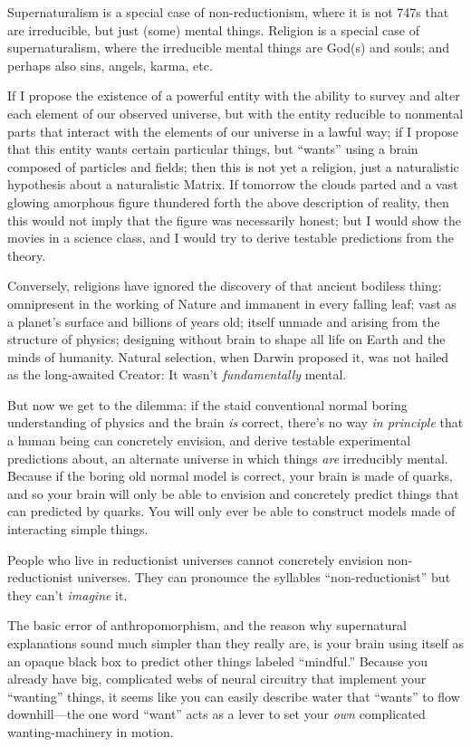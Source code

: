 {
 Supernaturalism is a special case of non-reductionism, where it is
not 747s that are irreducible, but just (some) mental things. Religion
is a special case of supernaturalism, where the irreducible mental
things are God(s) and souls; and perhaps also sins, angels, karma,
etc.}

{
 If I propose the existence of a powerful entity with the ability
to survey and alter each element of our observed universe, but with the
entity reducible to nonmental parts that interact with the elements of
our universe in a lawful way; if I propose that this entity wants
certain particular things, but
``wants'' using a brain composed of
particles and fields; then this is not yet a religion, just a
naturalistic hypothesis about a naturalistic Matrix. If tomorrow the
clouds parted and a vast glowing amorphous figure thundered forth the
above description of reality, then this would not imply that the figure
was necessarily honest; but I would show the movies in a science class,
and I would try to derive testable predictions from the theory.}

{
 Conversely, religions have ignored the discovery of that ancient
bodiless thing: omnipresent in the working of Nature and immanent in
every falling leaf; vast as a planet's surface and
billions of years old; itself unmade and arising from the structure of
physics; designing without brain to shape all life on Earth and the
minds of humanity. Natural selection, when Darwin proposed it, was not
hailed as the long-awaited Creator: It wasn't
\textit{fundamentally} mental.}

{
 But now we get to the dilemma: if the staid conventional normal
boring understanding of physics and the brain \textit{is} correct,
there's no way \textit{in principle} that a human being
can concretely envision, and derive testable experimental predictions
about, an alternate universe in which things \textit{are} irreducibly
mental. Because if the boring old normal model is correct, your brain
is made of quarks, and so your brain will only be able to envision and
concretely predict things that can predicted by quarks. You will only
ever be able to construct models made of interacting simple things.}

{
 People who live in reductionist universes cannot concretely
envision non-reductionist universes. They can pronounce the syllables
``non-reductionist'' but they
can't \textit{imagine} it.}

{
 The basic error of anthropomorphism, and the reason why
supernatural explanations sound much simpler than they really are, is
your brain using itself as an opaque black box to predict other things
labeled ``mindful.'' Because you
already have big, complicated webs of neural circuitry that implement
your ``wanting'' things, it seems
like you can easily describe water that
``wants'' to flow downhill---the one
word ``want'' acts as a lever to set
your \textit{own} complicated wanting-machinery in motion.}

